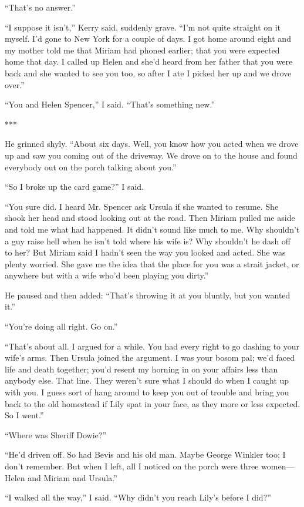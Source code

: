 \documentclass{novel}
\begin{document}
“That’s no answer.”

“I suppose it isn’t,” Kerry said, suddenly grave. “I’m not quite straight on it myself. I’d gone to New York for a couple of days. I got home around eight and my mother told me that Miriam had phoned earlier; that you were expected home that day. I called up Helen and she’d heard from her father that you were back and she wanted to see you too, so after I ate I picked her up and we drove over.”

“You and Helen Spencer,” I said. “That’s something new.”

***

He grinned shyly. “About six days. Well, you know how you acted when we drove up and saw you coming out of the driveway. We drove on to the house and found everybody out on the porch talking about you.”

“So I broke up the card game?” I said.

“You sure did. I heard Mr. Spencer ask Ursula if she wanted to resume. She shook her head and stood looking out at the road. Then Miriam pulled me aside and told me what had happened. It didn’t sound like much to me. Why shouldn’t a guy raise hell when he isn’t told where his wife is? Why shouldn’t he dash off to her? But Miriam said I hadn’t seen the way you looked and acted. She was plenty worried. She gave me the idea that the place for you was a strait jacket, or anywhere but with a wife who’d been playing you dirty.”

He paused and then added: “That’s throwing it at you bluntly, but you wanted it.”

“You’re doing all right. Go on.”

“That’s about all. I argued for a while. You had every right to go dashing to your wife’s arms. Then Ursula joined the argument. I was your bosom pal; we’d faced life and death together; you’d resent my horning in on your affairs less than anybody else. That line. They weren’t sure what I should do when I caught up with you. I guess sort of hang around to keep you out of trouble and bring you back to the old homestead if Lily spat in your face, as they more or less expected. So I went.”

“Where was Sheriff Dowie?”

“He’d driven off. So had Bevis and his old man. Maybe George Winkler too; I don’t remember. But when I left, all I noticed on the porch were three women—Helen and Miriam and Ursula.”

“I walked all the way,” I said. “Why didn’t you reach Lily’s before I did?”
\end{document}

